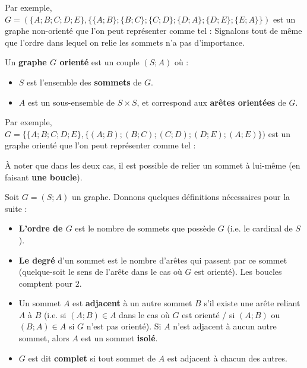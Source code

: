 	\begin{tip}[Exemple]
		\contentwidth[big]
		Par exemple, $G = (\{A; B; C; D; E\}, \{\{A; B\}; \{B; C\}; \{C; D\}; \{D; A\}; \{D; E\}; \{E; A\}\})$ est un graphe non-orienté que l'on peut représenter comme tel :
		Signalons tout de même que l'ordre dans lequel on relie les sommets n'a pas d'importance.
	\end{tip}

	\begin{formula}
		Un \textbf{graphe $G$ orienté} est un couple $(S; A)$ où :
		\begin{itemize}
			\item $S$ est l'ensemble des \textbf{sommets} de $G$.
			\item $A$ est un sous-ensemble de $S \times S$, et correspond aux \textbf{arêtes orientées} de $G$.
		\end{itemize}
	\end{formula}

	\begin{tip}[Exemple]
		\contentwidth[big]
		Par exemple, $G = \{\{A; B; C; D; E\}, \{(A; B); (B; C); (C; D); (D; E); (A; E)\})$ est un graphe orienté que l'on peut représenter comme tel :
	\end{tip}

	\begin{tip}
		À noter que dans les deux cas, il est possible de relier un sommet à lui-même (en faisant \textbf{une boucle}).
	\end{tip}

	\begin{formula}[Définition]
		Soit $G = (S; A)$ un graphe. Donnons quelques définitions nécessaires pour la suite :
		\begin{itemize}
			\item \textbf{L'ordre de $G$} est le nombre de sommets que possède $G$ (i.e. le cardinal de $S$).
			\item \textbf{Le degré} d'un sommet est le nombre d'arêtes qui passent par ce sommet (quelque-soit le sens de l'arête dans le cas où $G$ est orienté). Les boucles comptent pour $2$.
			\item Un sommet $A$ est \textbf{adjacent} à un autre sommet $B$ s'il existe une arête reliant $A$ à $B$ (i.e. si $(A; B) \in A$ dans le cas où $G$ est orienté / si $(A; B)$ ou $(B; A) \in A$ si $G$ n'est pas orienté). Si $A$ n'est adjacent à aucun autre sommet, alors $A$ est un sommet \textbf{isolé}.
			\item $G$ est dit \textbf{complet} si tout sommet de $A$ est adjacent à chacun des autres.
		\end{itemize}
	\end{formula}

